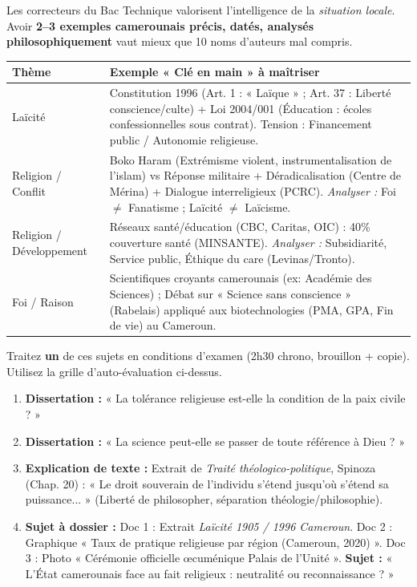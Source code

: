 \documentclass[11pt]{article}
\begin{document}
\begin{aretenir}
Les correcteurs du Bac Technique valorisent l'intelligence de la \emph{situation locale}. Avoir \textbf{2--3 exemples camerounais précis, datés, analysés philosophiquement} vaut mieux que 10 noms d'auteurs mal compris.
\begin{center}
\begin{tabularx}{\linewidth}{|l|X|}\hline
\rowcolor{popblueL}
\textbf{Thème} & \textbf{Exemple « Clé en main » à maîtriser} \\ \hline
Laïcité & Constitution 1996 (Art. 1 : « Laïque » ; Art. 37 : Liberté conscience/culte) + Loi 2004/001 (Éducation : écoles confessionnelles sous contrat). Tension : Financement public / Autonomie religieuse. \\ \hline
Religion / Conflit & Boko Haram (Extrémisme violent, instrumentalisation de l'islam) vs Réponse militaire + Déradicalisation (Centre de Mérina) + Dialogue interreligieux (PCRC). \emph{Analyser :} Foi $\neq$ Fanatisme ; Laïcité $\neq$ Laïcisme. \\ \hline
Religion / Développement & Réseaux santé/éducation (CBC, Caritas, OIC) : 40\% couverture santé (MINSANTE). \emph{Analyser :} Subsidiarité, Service public, Éthique du care (Levinas/Tronto). \\ \hline
Foi / Raison & Scientifiques croyants camerounais (ex: Académie des Sciences) ; Débat sur « Science sans conscience » (Rabelais) appliqué aux biotechnologies (PMA, GPA, Fin de vie) au Cameroun. \\ \hline
\end{tabularx}
\end{center}
\end{aretenir}

\begin{exercice}
Traitez \textbf{un} de ces sujets en conditions d'examen (2h30 chrono, brouillon + copie). Utilisez la grille d'auto-évaluation ci-dessus.
\begin{enumerate}
    \item \textbf{Dissertation :} « La tolérance religieuse est-elle la condition de la paix civile ? »
    \item \textbf{Dissertation :} « La science peut-elle se passer de toute référence à Dieu ? »
    \item \textbf{Explication de texte :} Extrait de \emph{Traité théologico-politique}, Spinoza (Chap. 20) : « Le droit souverain de l'individu s'étend jusqu'où s'étend sa puissance... » (Liberté de philosopher, séparation théologie/philosophie).
    \item \textbf{Sujet à dossier :} Doc 1 : Extrait \emph{Laïcité 1905 / 1996 Cameroun}. Doc 2 : Graphique « Taux de pratique religieuse par région (Cameroun, 2020) ». Doc 3 : Photo « Cérémonie officielle œcuménique Palais de l'Unité ». \textbf{Sujet :} « L'État camerounais face au fait religieux : neutralité ou reconnaissance ? »
\end{enumerate}
\end{exercice}
\end{document}
